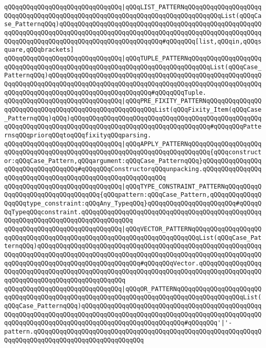 \verb|qQQqqQQqqQQqqQQqqQQqqQQqqQQqqQQq|\verb#|qQQqLIST_PATTERNqQQqqQQqqQQqqQQqqQQqqQQqqQQqqQQqqQQqqQQqqQQqqQQqqQQqqQQqqQQqqQQqqQQqqQQqqQQqqQQqList(qQQqCase_PatternqQQq)qQQqqQQqqQQqqQQqqQQqqQQqqQQqqQQqqQQqqQQqqQQqqQQqqQQqqQQqqQQqqQQqqQQqqQQqqQQqqQQqqQQqqQQqqQQqqQQqqQQqqQQqqQQqqQQqqQQqqQQqqQQqqQQqqQQqqQQqqQQqqQQqqQQqqQQqqQQqqQQqqQQqqQQq#\verb|#qQQqqQQq[list,qQQqin,qQQqsquare,qQQqbrackets]|\newline
\verb|qQQqqQQqqQQqqQQqqQQqqQQqqQQqqQQq|\verb#|qQQqTUPLE_PATTERNqQQqqQQqqQQqqQQqqQQqqQQqqQQqqQQqqQQqqQQqqQQqqQQqqQQqqQQqqQQqqQQqqQQqqQQqqQQqList(qQQqCase_PatternqQQq)qQQqqQQqqQQqqQQqqQQqqQQqqQQqqQQqqQQqqQQqqQQqqQQqqQQqqQQqqQQqqQQqqQQqqQQqqQQqqQQqqQQqqQQqqQQqqQQqqQQqqQQqqQQqqQQqqQQqqQQqqQQqqQQqqQQqqQQqqQQqqQQqqQQqqQQqqQQqqQQqqQQqqQQq#\verb|#qQQqqQQqTuple.|\newline
\verb|qQQqqQQqqQQqqQQqqQQqqQQqqQQqqQQq|\verb#|qQQqPRE_FIXITY_PATTERNqQQqqQQqqQQqqQQqqQQqqQQqqQQqqQQqqQQqqQQqqQQqqQQqqQQqqQQqList(qQQqFixity_Item(qQQqCase_PatternqQQq)qQQq)qQQqqQQqqQQqqQQqqQQqqQQqqQQqqQQqqQQqqQQqqQQqqQQqqQQqqQQqqQQqqQQqqQQqqQQqqQQqqQQqqQQqqQQqqQQqqQQqqQQqqQQqqQQq#\verb|#qQQqqQQqPatternsqQQqpriorqQQqtoqQQqfixityqQQqparsing.|\newline
\verb|qQQqqQQqqQQqqQQqqQQqqQQqqQQqqQQq|\verb#|qQQqAPPLY_PATTERNqQQqqQQqqQQqqQQqqQQqqQQqqQQqqQQqqQQqqQQqqQQqqQQqqQQqqQQqqQQqqQQqqQQqqQQqqQQq{qQQqconstructor:qQQqCase_Pattern,qQQqargument:qQQqCase_PatternqQQq}qQQqqQQqqQQqqQQqqQQqqQQqqQQqqQQqqQQq#\verb|#qQQqqQQqConstructorqQQqunpacking.qQQqqQQqqQQqqQQqqQQqqQQqqQQqqQQqqQQqqQQqqQQqqQQqqQQqqQQqqQQq|\newline
\verb|qQQqqQQqqQQqqQQqqQQqqQQqqQQqqQQq|\verb#|qQQqTYPE_CONSTRAINT_PATTERNqQQqqQQqqQQqqQQqqQQqqQQqqQQqqQQqqQQq{qQQqpattern:qQQqCase_Pattern,qQQqqQQqqQQqqQQqqQQqtype_constraint:qQQqAny_TypeqQQq}qQQqqQQqqQQqqQQqqQQqqQQq#\verb|#qQQqqQQqTypeqQQqconstraint.qQQqqQQqqQQqqQQqqQQqqQQqqQQqqQQqqQQqqQQqqQQqqQQqqQQqqQQqqQQqqQQqqQQqqQQqqQQqqQQqqQQq|\newline
\verb|qQQqqQQqqQQqqQQqqQQqqQQqqQQqqQQq|\verb#|qQQqVECTOR_PATTERNqQQqqQQqqQQqqQQqqQQqqQQqqQQqqQQqqQQqqQQqqQQqqQQqqQQqqQQqqQQqqQQqqQQqqQQqList(qQQqCase_PatternqQQq)qQQqqQQqqQQqqQQqqQQqqQQqqQQqqQQqqQQqqQQqqQQqqQQqqQQqqQQqqQQqqQQqqQQqqQQqqQQqqQQqqQQqqQQqqQQqqQQqqQQqqQQqqQQqqQQqqQQqqQQqqQQqqQQqqQQqqQQqqQQqqQQqqQQqqQQqqQQqqQQqqQQqqQQq#\verb|#qQQqqQQqVector.qQQqqQQqqQQqqQQqqQQqqQQqqQQqqQQqqQQqqQQqqQQqqQQqqQQqqQQqqQQqqQQqqQQqqQQqqQQqqQQqqQQqqQQqqQQqqQQqqQQqqQQqqQQqqQQqqQQqqQQq|\newline
\verb|qQQqqQQqqQQqqQQqqQQqqQQqqQQqqQQq|\verb#|qQQqOR_PATTERNqQQqqQQqqQQqqQQqqQQqqQQqqQQqqQQqqQQqqQQqqQQqqQQqqQQqqQQqqQQqqQQqqQQqqQQqqQQqqQQqqQQqqQQqList(qQQqCase_PatternqQQq)qQQqqQQqqQQqqQQqqQQqqQQqqQQqqQQqqQQqqQQqqQQqqQQqqQQqqQQqqQQqqQQqqQQqqQQqqQQqqQQqqQQqqQQqqQQqqQQqqQQqqQQqqQQqqQQqqQQqqQQqqQQqqQQqqQQqqQQqqQQqqQQqqQQqqQQqqQQqqQQqqQQqqQQq#\verb|#qQQqqQQq'|\verb#|'-pattern.qQQqqQQqqQQqqQQqqQQqqQQqqQQqqQQqqQQqqQQqqQQqqQQqqQQqqQQqqQQqqQQqqQQqqQQqqQQqqQQqqQQqqQQqqQQqqQQqqQQq#\newline
